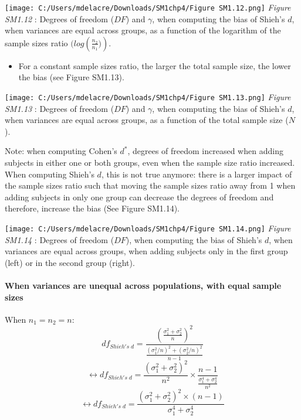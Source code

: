 \documentclass[
  english,
  man,mask,floatsintext]{apa6}
\providecommand{\tightlist}{%
  \setlength{\itemsep}{0pt}\setlength{\parskip}{0pt}}
\let\oldparagraph\paragraph
\renewcommand{\paragraph}[1]{\oldparagraph{#1}\mbox{}}
\begin{document}
\texttt{[image: C:/Users/mdelacre/Downloads/SM1chp4/Figure SM1.12.png]}
\emph{Figure SM1.12} : Degrees of freedom (\(DF\)) and \(\gamma\), when computing the bias of Shieh's \(d\), when variances are equal across groups, as a function of the logarithm of the sample sizes ratio \((log \left(\frac{n_2}{n_1})\right)\).

\begin{itemize}
\tightlist
\item
  For a constant sample sizes ratio, the larger the total sample size, the lower the bias (see Figure SM1.13).
\end{itemize}

\texttt{[image: C:/Users/mdelacre/Downloads/SM1chp4/Figure SM1.13.png]}
\emph{Figure SM1.13} : Degrees of freedom (\(DF\)) and \(\gamma\), when computing the bias of Shieh's \(d\), when variances are equal across groups, as a function of the total sample size (\(N\)).

Note: when computing Cohen's \(d^*\), degrees of freedom increased when adding subjects in either one or both groups, even when the sample size ratio increased. When computing Shieh's \(d\), this is not true anymore: there is a larger impact of the sample sizes ratio such that moving the sample sizes ratio away from 1 when adding subjects in only one group can decrease the degrees of freedom and therefore, increase the bias (See Figure SM1.14).

\texttt{[image: C:/Users/mdelacre/Downloads/SM1chp4/Figure SM1.14.png]}
\emph{Figure SM1.14} : Degrees of freedom (\(DF\)), when computing the bias of Shieh's \(d\), when variances are equal across groups, when adding subjects only in the first group (left) or in the second group (right).

\hypertarget{when-variances-are-unequal-across-populations-with-equal-sample-sizes-1}{%
\paragraph{When variances are unequal across populations, with equal sample sizes}\label{when-variances-are-unequal-across-populations-with-equal-sample-sizes-1}}

When \(n_1=n_2=n\):
\[df_{Shieh's \; d} = \frac{\left( \frac{\sigma_1^2+\sigma_2^2}{n} \right)^2}{\frac{(\sigma_1^2/n)^2+(\sigma_2^2/n)^2}{n-1}}\]
\[\leftrightarrow df_{Shieh's \; d} = \frac{(\sigma_1^2+\sigma_2^2)^2}{n^2} \times\frac{n-1}{\frac{\sigma_1^4+\sigma_2^4}{n^2}}\]
\[\leftrightarrow df_{Shieh's \; d} = \frac{(\sigma_1^2+\sigma_2^2)^2 \times (n-1)}{\sigma_1^4+\sigma_2^4}\]
\end{document}
